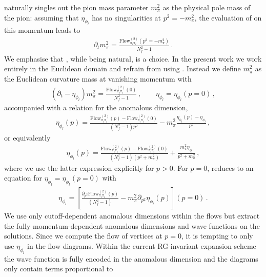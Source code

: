 \documentclass[aps,twocolumn,prd,superscriptaddress]{revtex4-2}
\begin{document}
 naturally singles out the pion mass parameter $m_\pi^2$ as the physical pole mass of the pion: assuming that $\eta_{\phi_l}$ has no singularities at $p^2=-m_\pi^2$, the evaluation of  on this momentum leads to 
%
\begin{align}
	\partial_t m_\pi^2  = \frac{\textrm{Flow}^{(2)}_{\pi_i \pi_i}(p^2=-m_\pi^2)}{N_f^2-1} \,. 
	\label{eq:PoleMass}
\end{align}
%
We emphasise that , while being natural, is a choice. In the present work we work entirely in the Euclidean domain and refrain from using . Instead we define $m_\pi^2$ as the Euclidean curvature mass at vanishing momentum with 
%
\begin{align}
	\left( \partial_t -\eta_{\phi_l}\right) m_\pi^2  = \frac{\textrm{Flow}^{(2)}_{\pi_i \pi_i}(0)}{N_f^2-1} \,,\qquad  \eta_{\phi_l} = \eta_{\phi_l}(p=0) \,,
	\label{eq:CurvatureMass}
\end{align}
%
accompanied with a relation for the anomalous dimension, 
%
\begin{align}
	\eta_{\phi_l}(p) = \frac{\textrm{Flow}^{(2)}_{\pi_i \pi_i}(p) - \textrm{Flow}^{(2)}_{\pi_i \pi_i}(0)}{(N_f^2-1) p^2 } -m_\pi^2 \frac{\eta_{\phi_l}(p)-  \eta_{\phi_l}}{p^2}  \,,
	\label{eq:AnomalousDim}
\end{align}
%
or equivalently
%
\begin{align}
	\eta_{\phi_l}(p) = \frac{\textrm{Flow}^{(2)}_{\pi_i \pi_i}(p) - \textrm{Flow}^{(2)}_{\pi_i \pi_i}(0)}{(N_f^2-1) (p^2 + m_\pi^2) } +\frac{m_\pi^2 \eta_{\phi_l}}{p^2 + m_\pi^2}  \,,
	\label{eq:AnomalousDimEasier}
\end{align}
%
where we use the latter expression explicitly for $p > 0$. For $p=0$,  reduces to an equation for $\eta_{\phi_l}=\eta_{\phi_l}(p=0)$ with 
%
\begin{align}
	\eta_{\phi_l}= \left[ \frac{\partial_{p^2}\textrm{Flow}^{(2)}_{\pi_i \pi_i}(p)}{(N_f^2-1)} -m_\pi^2 \partial_{p^2}\eta_{\phi_l}(p)\right](p=0) \,. 
	\label{eq:AnomalousDim0}
\end{align}
%
We use only cutoff-dependent anomalous dimensions within the flows but extract the fully momentum-dependent anomalous dimensions and wave functions on the solutions. Since we compute the flow of vertices at $p=0$, it is tempting to only use $\eta_{\phi_l}$ in the flow diagrams. Within the current RG-invariant expansion scheme the wave function is fully encoded in the anomalous dimension and the diagrams only contain terms proportional to 
\end{document}
